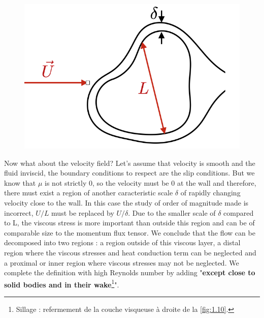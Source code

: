 		\begin{figure}
		\vspace{-5mm}
		\includegraphics[scale=0.35]{ch1/10}
		\label{fig:1.10}
		\end{figure}
		Now what about the velocity field? Let's assume that velocity is smooth and the fluid inviscid, the boundary conditions to respect are the slip conditions. But we know that $\mu$ is not strictly 0, so the velocity must be 0 at the wall and therefore, there must exist a region of another caracteristic scale $\delta$ of rapidly changing velocity close to the wall. In this case the study of order of magnitude made is incorrect, $U/L$ must be replaced by $U/\delta$. Due to the smaller scale of $\delta$ compared to L, the viscous stress is more important than outside this region and can be of comparable size to the momentum flux tensor.
		 We conclude that the flow can be decomposed into two regions : a region outside of this viscous layer, a distal region where the viscous stresses and heat conduction term can be neglected and a proximal or inner region where viscous stresses may not be neglected. We complete the definition with high Reynolds number by adding "\textbf{except close to solid bodies and in their wake}\footnote{Sillage : refermement de la couche visqueuse à droite de la \autoref{fig:1.10}.}".
		 
